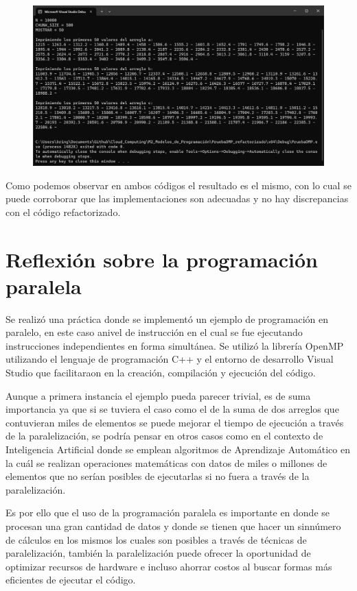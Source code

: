 \documentclass[12pt,a4paper]{article}
\begin{document}
\begin{figure}[H]
    \centering
    \includegraphics[width=1\linewidth]{M2_Modelos_de_Programación/reporte/figuras/Código_refactorizado_resultados.png}
    \label{fig:Código_refactorizado_resultados}
\end{figure}

Como podemos observar en ambos códigos el resultado es el mismo, con lo cual se puede corroborar que las implementaciones son adecuadas y no hay discrepancias con el código refactorizado.


\section{Reflexión sobre la programación paralela}

Se realizó una práctica donde se implementó un ejemplo de programación en paralelo, en este caso anivel de instrucción en el cual se fue ejecutando instrucciones independientes en forma simultánea. Se utilizó la librería OpenMP utilizando el lenguaje de programación C++ y el entorno de desarrollo Visual Studio que facilitaraon en la creación, compilación y ejecución del código.

\vspace{1em}

Aunque a primera instancia el ejemplo pueda parecer trivial, es de suma importancia ya que si se tuviera el caso como el de la suma de dos arreglos que contuvieran miles de elementos se puede mejorar el tiempo de ejecución a través de la paralelización, se podría pensar en otros casos como en el contexto de Inteligencia Artificial donde se emplean algoritmos de Aprendizaje Automático en la cuál se realizan operaciones matemáticas con datos de miles o millones de elementos que no serían posibles de ejecutarlas si no fuera a través de la paralelización.

\vspace{1em}

Es por ello que el uso de la programación paralela es importante en donde se procesan una gran cantidad de datos y donde se tienen que hacer un sinnúmero de cálculos en los mismos los cuales son posibles a través de técnicas de paralelización, también la paralelización puede ofrecer la oportunidad de optimizar recursos de hardware e incluso ahorrar costos al buscar formas más eficientes de ejecutar el código.
\end{document}
